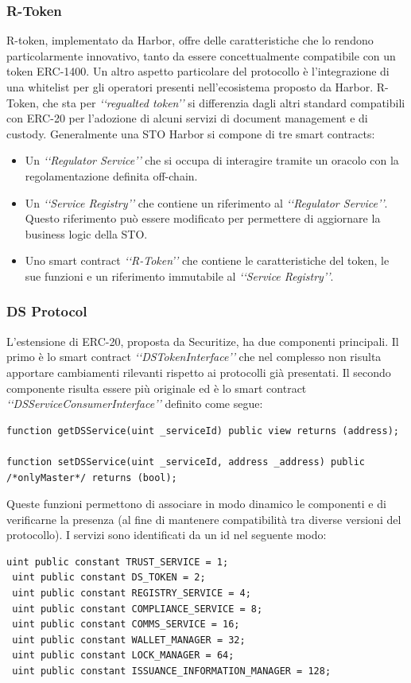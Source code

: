\subsubsection{R-Token}
R-token, implementato da Harbor, offre delle caratteristiche che lo rendono particolarmente innovativo, tanto da essere concettualmente compatibile con un token ERC-1400. Un altro aspetto particolare del protocollo è l'integrazione di una whitelist per gli operatori presenti nell'ecosistema proposto da Harbor. 
R-Token, che sta per \textit{‘‘regualted token’’} si differenzia dagli altri standard compatibili con ERC-20 per l'adozione di alcuni servizi di document management e di custody. 
Generalmente una STO Harbor si compone di tre smart contracts:
\begin{itemize}
    \item Un \textit{‘‘Regulator Service’’} che si occupa di interagire tramite un oracolo con la regolamentazione definita off-chain. 
    \item Un \textit{‘‘Service Registry’’} che contiene un riferimento al \textit{‘‘Regulator Service’’}. Questo riferimento può essere modificato per permettere di aggiornare la business logic della STO. 
    \item Uno smart contract \textit{‘‘R-Token’’} che contiene le caratteristiche del token, le sue funzioni e un riferimento immutabile al \textit{‘‘Service Registry’’}.
\end{itemize}
\subsubsection{DS Protocol}
L'estensione di ERC-20, proposta da Securitize, ha due componenti principali. Il primo è lo smart contract \textit{‘‘DSTokenInterface’’} che nel complesso non risulta apportare cambiamenti rilevanti rispetto ai protocolli già presentati. Il secondo componente risulta essere più originale ed è lo smart contract \textit{‘‘DSServiceConsumerInterface’’} definito come segue:
\begin{lstlisting}[language=Solidity,numbers=none]
function getDSService(uint _serviceId) public view returns (address);

function setDSService(uint _serviceId, address _address) public /*onlyMaster*/ returns (bool);
\end{lstlisting}
Queste funzioni permettono di associare in modo dinamico le componenti e di verificarne la presenza (al fine di mantenere compatibilità tra diverse versioni del protocollo). I servizi sono identificati da un id nel seguente modo:
\begin{lstlisting}[language=Solidity,numbers=none]
 uint public constant TRUST_SERVICE = 1;
 uint public constant DS_TOKEN = 2;
 uint public constant REGISTRY_SERVICE = 4;
 uint public constant COMPLIANCE_SERVICE = 8;
 uint public constant COMMS_SERVICE = 16;
 uint public constant WALLET_MANAGER = 32;
 uint public constant LOCK_MANAGER = 64;
 uint public constant ISSUANCE_INFORMATION_MANAGER = 128;
 \end{lstlisting}
